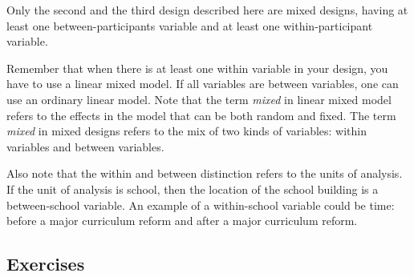 \documentclass[]{book}\usepackage[]{graphicx}\usepackage[]{color}
\begin{document}
Only the second and the third design described here are mixed designs, having at least one between-participants variable and at least one within-participant variable. 

Remember that when there is at least one within variable in your design, you have to use a linear mixed model. If all variables are between variables, one can use an ordinary linear model. Note that the term \textit{mixed} in linear mixed model refers to the effects in the model that can be both random and fixed. The term \textit{mixed} in mixed designs refers to the mix of two kinds of variables: within variables and between variables. 

Also note that the within and between distinction refers to the units of analysis. If the unit of analysis is school, then the location of the school building is a between-school variable. An example of a within-school variable could be time: before a major curriculum reform and after a major curriculum reform. 

\subsection{Exercises}
\end{document}

